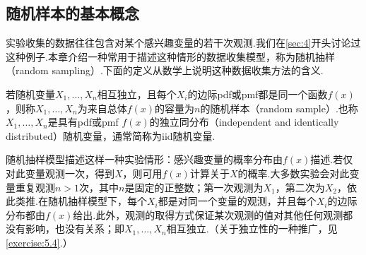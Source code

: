 \subsection{随机样本的基本概念}\label{sec:5.1}
实验收集的数据往往包含对某个感兴趣变量的若干次观测.我们在\autoref{sec:4}开头讨论过这种例子.本章介绍一种常用于描述这种情形的数据收集模型，称为随机抽样（random sampling）.下面的定义从数学上说明这种数据收集方法的含义.
\begin{definition}\label{def:5.1.1}
若随机变量$X_1,\ldots,X_n$相互独立，且每个$X_i$的边际pdf或pmf都是同一个函数$f(x)$，则称$X_1,\ldots,X_n$为来自总体$f(x)$的容量为$n$的随机样本（random sample）.也称$X_1,\ldots,X_n$是具有pdf或pmf $f(x)$的独立同分布（independent and identically distributed）随机变量，通常简称为iid随机变量.
\end{definition}
随机抽样模型描述这样一种实验情形：感兴趣变量的概率分布由$f(x)$描述.若仅对此变量观测一次，得到$X$，则可用$f(x)$计算关于$X$的概率.大多数实验会对此变量重复观测$n>1$次，其中$n$是固定的正整数；第一次观测为$X_1$，第二次为$X_2$，依此类推.在随机抽样模型下，每个$X_i$都是对同一个变量的观测，并且每个$X_i$的边际分布都由$f(x)$给出.此外，观测的取得方式保证某次观测的值对其他任何观测都没有影响，也没有关系；即$X_1,\ldots,X_n$相互独立.（关于独立性的一种推广，见\autoref{exercise:5.4}.）

